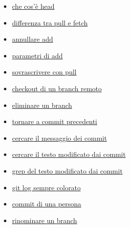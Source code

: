 \documentclass{article} \usepackage[textwidth=19cm,textheight=24cm]{geometry}
\begin{document}
\begin{itemize}
    \item \href{https://stackoverflow.com/questions/9529497/what-is-origin-in-git}
        {che cos'è head}
    \item \href{https://stackoverflow.com/questions/292357/what-is-the-difference-between-git-pull-and-git-fetch}
        {differenza tra pull e fetch}
    \item \href{https://stackoverflow.com/questions/348170/how-do-i-undo-git-add-before-commit?rq=1}
        {annullare add}
    \item \href{https://stackoverflow.com/questions/572549/difference-between-git-add-a-and-git-add?rq=1}
        {parametri di add}
    \item \href{https://stackoverflow.com/questions/1125968/how-do-i-force-git-pull-to-overwrite-local-files?rq=1}
        {sovrascrivere con pull}
    \item \href{https://stackoverflow.com/questions/1783405/how-do-i-check-out-a-remote-git-branch?rq=1}
        {checkout di un branch remoto}
    \item \href{https://stackoverflow.com/questions/2003505/how-do-i-delete-a-git-branch-locally-and-remotely?rq=1}
        {eliminare un branch}
    \item \href{https://stackoverflow.com/questions/4114095/how-do-i-revert-a-git-repository-to-a-previous-commit?rq=1}
        {tornare a commit precedenti}
    \item \href{https://stackoverflow.com/questions/7124914/how-to-search-a-git-repository-by-commit-message}
        {cercare il messaggio dei commit}
    \item \href{https://stackoverflow.com/questions/5816134/how-to-find-the-git-commit-that-introduced-a-string-in-any-branch}
        {cercare il testo modificato dai commit}
    \item \href{https://stackoverflow.com/questions/2928584/how-to-grep-search-committed-code-in-the-git-history}
        {grep del testo modificato dai commit}
    \item \href{https://unix.stackexchange.com/questions/19317/can-less-retain-colored-output}
        {git log sempre colorato}
    \item \href{https://stackoverflow.com/questions/4259996/how-can-i-view-a-git-log-of-just-one-users-commits}
        {commit di una persona}
    \item \href{https://stackoverflow.com/questions/6591213/how-do-i-rename-a-local-git-branch?rq=1}
        {rinominare un branch }

\end{itemize}
\end{document}
